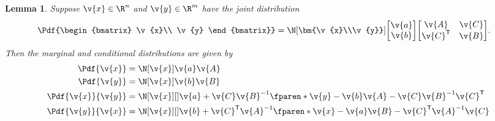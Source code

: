\documentclass[english,12pt]{article}
\newcommand{\y}{\v{y}}
\newcommand{\x}{\v{x}}
\newcommand{\tr}{\mathsf{T}}
\newtheorem{lemma}{Lemma}
\theoremstyle{definition}
\begin{document}
\begin{lemma} \label{lemma:gaussian_cond}
Suppose $\x\in\R^n$ and $\y\in\R^m$ have the joint distribution
\begin{align*}
	\Pdf{\begin{bmatrix}
		\x\\
		\y
	\end{bmatrix}}&=
	\N[\bm{\x\\\y}]{
	\begin{bmatrix}
		\v{a}\\
		\v{b}
	\end{bmatrix}
	}{
	\begin{bmatrix}
		\v{A}&\v{C}\\
		\v{C}^\tr&\v{B}
	\end{bmatrix}
	}.
\end{align*}
Then the marginal and conditional distributions are given by
\begin{align*}
	\Pdf{\x} &= \N[\x]{\v{a}}{\v{A}}\\
	\Pdf{\y} &= \N[\x]{\v{b}}{\v{B}}\\
	\Pdf{\x}{\y}&= \N[\x][\displaystyle]{\v{a}+\v{C}\v{B}^{-1}\fparen*{\v{y}-\v{b}}}{\v{A}-\v{C}\v{B}^{-1}\v{C}^\tr}\\
	\Pdf{\y}{\x}&= \N[\x][\displaystyle]{\v{b}+\v{C}^\tr\v{A}^{-1}\fparen*{\v{x}-\v{a}}}{\v{B}-\v{C}^\tr\v{A}^{-1}\v{C}}
\end{align*}
\end{lemma}
\clearpage
\printbibliography
\end{document}
